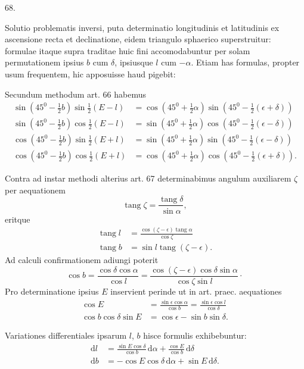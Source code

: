 \par{}\medskip
\hypertarget{native-087-article068}{}
\begin{center}68.\end{center}
Solutio problematis inversi, puta determinatio longitudinis et latitudinis ex ascensione recta et declinatione, eidem triangulo sphaerico superstruitur: formulae itaque supra traditae huic fini accomodabuntur per solam permutationem ipsius $b$ cum $\delta$, ipsiusque $l$ cum $-\alpha$. Etiam has formulas, propter usum frequentem, hic apposuisse haud pigebit:

Secundum methodum art. 66 habemus
\[
\begin{aligned}
\sin(45^0-\tfrac12 b)\sin\tfrac12(E-l)&=\cos(45^0+\tfrac12\alpha)\sin(45^0-\tfrac12(\epsilon+\delta))\\[.5em]
\sin(45^0-\tfrac12 b)\cos\tfrac12(E-l)&=\sin(45^0+\tfrac12\alpha)\cos(45^0-\tfrac12(\epsilon-\delta))\\[.5em]
\cos(45^0-\tfrac12 b)\sin\tfrac12(E+l)&=\sin(45^0+\tfrac12\alpha)\sin(45^0-\tfrac12(\epsilon-\delta))\\[.5em]
\cos(45^0-\tfrac12 b)\cos\tfrac12(E+l)&=\cos(45^0+\tfrac12\alpha)\cos(45^0-\tfrac12(\epsilon+\delta)).
\end{aligned}
\]

Contra ad instar methodi alterius art. 67 determinabimus angulum auxiliarem $\zeta$ per aequationem
\[
\operatorname{tang}\zeta=\frac{\operatorname{tang}\delta}{\sin\alpha},
\]
\noindent eritque
\[
\begin{aligned}
\operatorname{tang}l&=\frac{\cos(\zeta-\epsilon)\operatorname{tang}\alpha}{\cos\zeta}\\[.5em]
\operatorname{tang}b&=\sin l\operatorname{tang}(\zeta-\epsilon).
\end{aligned}
\]
\noindent Ad calculi confirmationem adiungi poterit
\[
\cos b=\frac{\cos\delta\cos\alpha}{\cos l}=\frac{\cos(\zeta-\epsilon)\cos\delta\sin\alpha}{\cos\zeta\sin l}\cdot
\]
\noindent Pro determinatione ipsius $E$ inservient perinde ut in art. praec. aequationes
\[
\begin{aligned}
\cos E&=\frac{\sin\epsilon\cos\alpha}{\cos b}=\frac{\sin\epsilon\cos l}{\cos\delta}\\[.5em]
\cos b\cos\delta\sin E&=\cos\epsilon-\sin b\sin\delta.
\end{aligned}
\]

Variationes differentiales ipsarum $l$, $b$ hisce formulis exhibebuntur:
\[
\begin{aligned}
\mathrm{d}l&=\frac{\sin E\cos\delta}{\cos b}\,\mathrm{d}\alpha+\frac{\cos E}{\cos b}\,\mathrm{d}\delta\\[.5em]
\mathrm{d}b&=-\cos E\cos\delta\,\mathrm{d}\alpha+\sin E\,\mathrm{d}\delta.
\end{aligned}
\]
